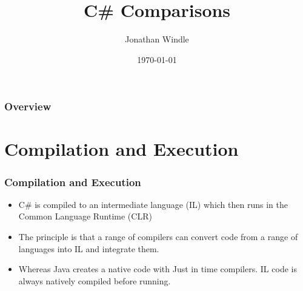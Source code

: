 \documentclass{beamer}
\title[C\# Comparisons]{C\# Comparisons} %
\author{Jonathan Windle} %
\institute[UEA] %
{
University of East Anglia \\ %
\medskip
\textit{J.Windle@uea.ac.uk} %
}
\date{\today} %
\begin{document}
\begin{frame}
\titlepage %
\end{frame}

\begin{frame}[allowframebreaks]
\frametitle{Overview} %
\tableofcontents %
\end{frame}
\section{Compilation and Execution}
\begin{frame}
\frametitle{Compilation and Execution}
\begin{itemize}
\item C\# is compiled to an {\color{red} intermediate language (IL)} which then runs in the {\color{green} Common Language Runtime (CLR)}
\item The principle is that a range of compilers can convert code from a range of languages into {\color{red}IL} and integrate them.
\item Whereas Java creates a native code with {\color{orange} Just in time} compilers. {\color{red}IL} code is always natively compiled before running.
\end{itemize}
\end{frame}
\end{document}
